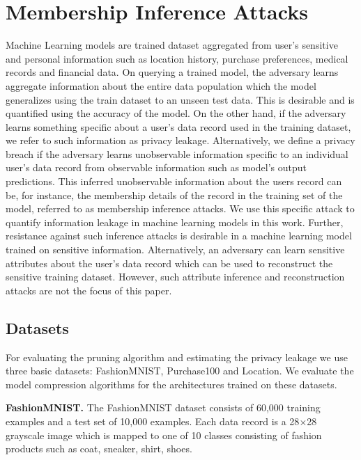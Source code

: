 \section{Membership Inference Attacks}\label{inferenceback}

Machine Learning models are trained dataset aggregated from user's sensitive and personal information such as location history, purchase preferences, medical records and financial data.
On querying a trained model, the adversary learns aggregate information about the entire data population which the model generalizes using the train dataset to an unseen test data. This is desirable and is quantified using the accuracy of the model.
On the other hand, if the adversary learns something specific about a user's data record used in the training dataset, we refer to such information as privacy leakage.
Alternatively, we define a privacy breach if the adversary learns unobservable information specific to an individual user's data record from observable information  such as model's output predictions.
This inferred unobservable information about the users record can be, for instance, the membership details of the record in the training set of the model, referred to as membership inference attacks.
We use this specific attack to quantify information leakage in machine learning models in this work. Further, resistance against such inference attacks is desirable in a machine learning model trained on sensitive information.
Alternatively, an adversary can learn sensitive attributes about the user's data record which can be used to reconstruct the sensitive training dataset. However, such attribute inference and reconstruction attacks are not the focus of this paper.

\subsection{Datasets}

For evaluating the pruning algorithm and estimating the privacy leakage we use three basic datasets: FashionMNIST, Purchase100 and Location.
We evaluate the model compression algorithms for the architectures trained on these datasets.

\noindent\textbf{FashionMNIST.} The FashionMNIST dataset consists of 60,000 training examples and a test set of 10,000 examples.
Each data record is a 28$\times$28 grayscale image which is mapped to one of 10 classes consisting of fashion products such as coat, sneaker, shirt, shoes.

